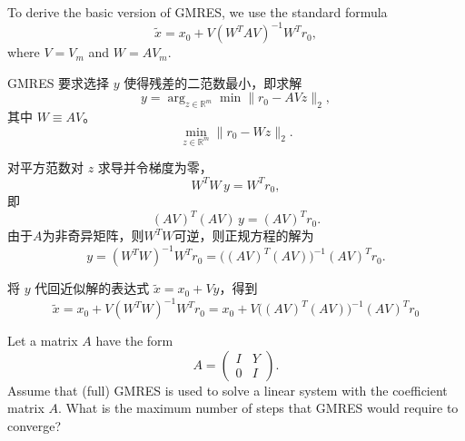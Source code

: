 \documentclass{ctexart}
\begin{document}
\begin{problem}
  To derive the basic version of GMRES, we use the standard formula
  \begin{equation} \label{eq:5.7}
    \tilde{x} = x_0 + V \left( W^{T} A V \right)^{-1} W^{T} r_0,
  \end{equation}
  where \( V = V_m \) and \( W = A V_m \).
\end{problem}
\begin{solution}
  GMRES 要求选择 \(y\) 使得残差的二范数最小，即求解
\[
y = \arg_{z\in\mathbb{R}^m}\min \|r_0 - A V z\|_2,
\]
其中 \(W \equiv A V\)。
\[
\min_{z\in\mathbb{R}^m} \|r_0 - W z\|_2.
\]

对平方范数对 \(z\) 求导并令梯度为零，
\[
W^T W \, y = W^T r_0,
\]
即
\[
( A V )^T ( A V ) \, y = ( A V )^T r_0.
\]
由于\(A \)为非奇异矩阵，则\(W^T W\)可逆，则正规方程的解为
\[
y = (W^T W)^{-1} W^T r_0 = \big( (AV)^T (AV) \big)^{-1} (AV)^T r_0.
\]

将 \(y\) 代回近似解的表达式 \( \tilde{x} = x_0 + V y \)，得到
\[
\boxed{ \;
\tilde{x} = x_0 + V (W^T W)^{-1} W^T r_0
= x_0 + V \big( (AV)^T(AV) \big)^{-1} (AV)^T r_0 \;
}
\]
\end{solution}

\begin{problem}
  Let a matrix \( A \) have the form
  \[
    A =
    \begin{pmatrix}
      I & Y \\
      0 & I
    \end{pmatrix}.
  \]
  Assume that (full) GMRES is used to solve a linear system with the coefficient matrix \( A \).
  What is the maximum number of steps that GMRES would require to converge?
\end{problem}
\begin{solution}
  
\end{solution}
\end{document}
